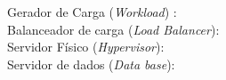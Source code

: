 \begin{description}
	\item[Gerador de Carga (\textit{Workload}) :]
	\item[Balanceador de carga (\textit{Load Balancer}):]
	\item[Servidor Físico (\textit{Hypervisor}):]
	\item[Servidor de dados (\textit{Data base}):]	
\end{description}





